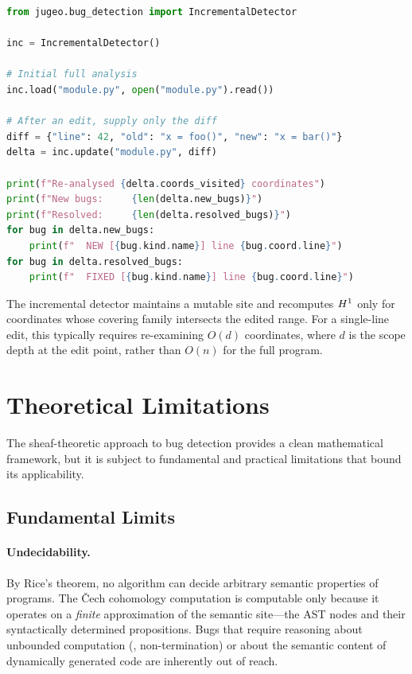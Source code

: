 \documentclass[11pt]{article}
\begin{document}
\begin{lstlisting}[language=Python, caption={Incremental detection for editor integration
  with diff-based re-analysis.}]
from jugeo.bug_detection import IncrementalDetector

inc = IncrementalDetector()

# Initial full analysis
inc.load("module.py", open("module.py").read())

# After an edit, supply only the diff
diff = {"line": 42, "old": "x = foo()", "new": "x = bar()"}
delta = inc.update("module.py", diff)

print(f"Re-analysed {delta.coords_visited} coordinates")
print(f"New bugs:     {len(delta.new_bugs)}")
print(f"Resolved:     {len(delta.resolved_bugs)}")
for bug in delta.new_bugs:
    print(f"  NEW [{bug.kind.name}] line {bug.coord.line}")
for bug in delta.resolved_bugs:
    print(f"  FIXED [{bug.kind.name}] line {bug.coord.line}")
\end{lstlisting}

The incremental detector maintains a mutable site and recomputes
$H^{1}$ only for coordinates whose covering family intersects
the edited range.  For a single-line edit, this typically requires
re-examining $O(d)$ coordinates, where $d$ is the scope depth
at the edit point, rather than $O(n)$ for the full program.

\section{Theoretical Limitations}\label{sec:limitations}

The sheaf-theoretic approach to bug detection provides a clean
mathematical framework, but it is subject to fundamental and practical
limitations that bound its applicability.

\subsection{Fundamental Limits}

\paragraph{Undecidability.}
By Rice's theorem, no algorithm can decide arbitrary semantic
properties of programs.  The \v{C}ech cohomology computation is
computable only because it operates on a \emph{finite} approximation
of the semantic site---the AST nodes and their syntactically
determined propositions.  Bugs that require reasoning about
unbounded computation (\eg, non-termination) or about the semantic
content of dynamically generated code are inherently out of reach.
\end{document}
